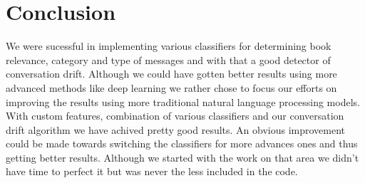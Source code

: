 \documentclass[11pt,a4paper]{article}
\begin{document}


\section{Conclusion}

We were sucessful in implementing various classifiers for determining book relevance, category and type of messages and with that a good detector of conversation drift.
Although we could have gotten better results using more advanced methods like deep learning we rather chose to focus our efforts on improving the results using more traditional natural language processing models.
With custom features, combination of various classifiers and our conversation drift algorithm we have achived pretty good results.
An obvious improvement could be made towards switching the classifiers for more advances ones and thus getting better results.
Although we started with the work on that area we didn't have time to perfect it but was never the less included in the code.

% 


\end{document}
